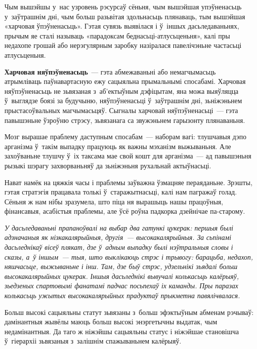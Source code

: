 Чым вышэйшы у~нас узровень рэсурсаў сёньня, чым вышэйшая упэўненасьць у~заўтрашнім дні, чым больш разьвітая здольнасьць плянаваць, тым вышэйшая «харчовая ўпэўненасьць». Гэтая сувязь выявілася і ў~іншых дасьледаваньнях, прычым яе сталі называць «парадоксам беднасьці-атлусьценьня», калі пры недахопе грошай або нерэгулярным заробку назіралася павелічэньне частасьці атлусьценьня.

\textbf{Харчовая няўпэўненасьць}~--- гэта абмежаваньні або немагчымасьць атрымліваць паўнавартасную ежу сацыяльна прымальнымі спосабамі. Харчовая няўпэўненасьць не зьвязаная з~аб'ектыўным дэфіцытам, яна можа выяўляцца ў~выглядзе боязі за будучыню, няўпэўненасьці ў~заўтрашнім дні, зьніжэньнем прыстасоўвальных магчымасьцяў. Сыгналы харчовай няўпэўненасьці~--- гэта павышэньне ўзроўню стрэсу, зьвязанага са звужэньнем гарызонту плянаваньня. 


Мозг вырашае праблему даступным спосабам~--- наборам вагі: тлушчавыя дэпо арганізма ў~такім выпадку працуюць як важны мэханізм выжываньня. Але захоўваньне тлушчу ў~іх таксама мае свой кошт для арганізма~--- ад павышэньня рызыкі шэрагу захворваньняў да зьніжэньня рухальнай актыўнасьці. 

Нават намёк на цяжкія часы і праблемы заўважна ўзмацняе пераяданьне. Зрэшты, гэтая стратэгія працавала толькі ў~старажытнасьці, калі нам пагражаў голад. Сёньня ж нам нібы зразумела, што піца ня вырашыць нашы працоўныя, фінансавыя, асабістыя праблемы, але ўсё роўна падкорка дзейнічае па-старому.

\emph{У дасьледаваньні прапаноўвалі на выбар два гатункі цукерак: першыя былі адзначаныя як нізкакалярыйныя, другія~--- высокакалярыйныя. За сьпінамі дасьледнікаў вісеў плякат, дзе ў~адным выпадку былі нэўтральныя словы і сказы, а~ў іншым~--- тыя, што выклікаюць стрэс і трывогу: барацьба, недахоп, няшчасьце, выжываньне і інш. Там, дзе быў стрэс, удзельнікі зьядалі больш высокакалярыйных цукерак. Іншыя дасьледнікі вывучалі колькасьць калёрыяў, зьедзеных спартовымі фанатамі падчас посьпехаў іх каманды. Пры паразах колькасьць ужытых высокакалярыйных прадуктаў прыкметна павялічвалася.}

Больш высокі сацыяльны статут зьвязаны з~больш эфэктыўным абменам рэчываў: дамінантныя жывёлы маюць больш высокі энэргетычны выдатак, чым недамінантныя. Да таго ж ніжэйшы сацыяльны статус і ніжэйшае становішча ў~гіерархіі зьвязаныя з~залішнім спажываньнем калёрыяў.

